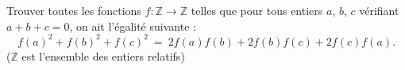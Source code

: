 Trouver toutes les fonctions $f : \mathbb{Z} \to \mathbb{Z}$ telles que pour tous entiers $a$, $b$, $c$
vérifiant $a + b + c = 0$, on ait l'égalité suivante :
\[
f(a)^2 + f(b)^2 + f(c)^2 \ = \ 2f(a)f(b) + 2f(b)f(c) + 2f(c)f(a).
\]
($\mathbb{Z}$ est l'ensemble des entiers relatifs)

